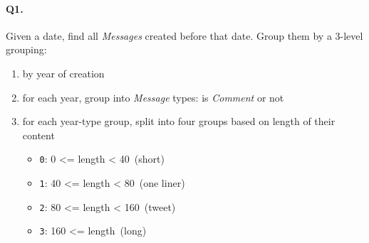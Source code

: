 \paragraph{Q1.}
Given a date, find all \emph{Messages} created before that date. Group
them by a 3-level grouping:
\begin{enumerate}
\def\labelenumi{\arabic{enumi}.}
\tightlist
\item
  by year of creation
\item
  for each year, group into \emph{Message} types: is \emph{Comment} or
  not
\item
  for each year-type group, split into four groups based on length of
  their content
  \begin{itemize}
  \tightlist
  \item
    \texttt{0}: 0 \textless{}= length \textless{} 40~(short)
  \item
    \texttt{1}: 40 \textless{}= length \textless{} 80~(one liner)
  \item
    \texttt{2}: 80 \textless{}= length \textless{} 160~(tweet)
  \item
    \texttt{3}: 160 \textless{}= length~(long)
  \end{itemize}
\end{enumerate}
